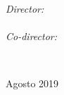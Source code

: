 \documentclass[
11pt, %
spanish, %
singlespacing, %
headsepline, %
]{MastersDoctoralThesis} %
\begin{document}
\begin{titlepage}
\begin{center}
\begin{minipage}[t]{0.5\textwidth}
\begin{flushleft}
			\end{flushleft}
		\end{minipage}
		\begin{minipage}[t]{0.4\textwidth}
			\begin{flushright} \large
				\emph{Director:} \\
				\supname \\
				\emph{Co-director:} \\
				\examname
			\end{flushright}
		\end{minipage}\\[2cm]
				 
		\vfill
				
				 
		\vfill
				
		{\large {Agosto 2019}}\\[4cm] %
				 
		\vfill
	\end{center}
\end{titlepage}




\end{document}
